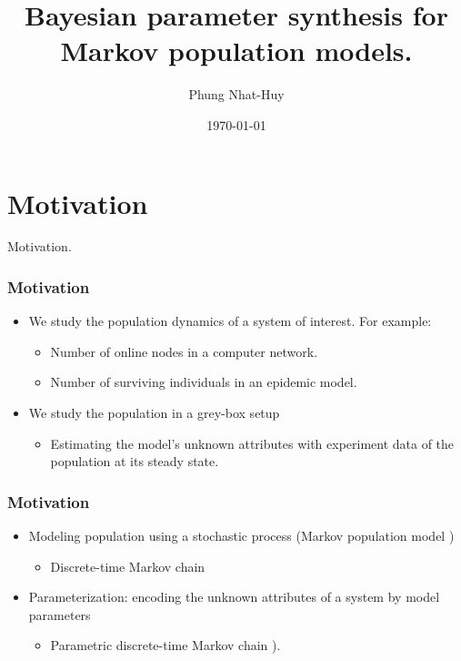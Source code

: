 \documentclass{beamer}
\title{Bayesian parameter synthesis for Markov population models.}
\author{Phung Nhat-Huy}
\date{\today}
\institute{University of Konstanz}
\begin{document}
\frame{\titlepage}
\frame{\tableofcontents}

\section{Motivation}
\begin{frame}
    \begin{center}
        \Huge Motivation.
    \end{center}
\end{frame}

\begin{frame}
    \frametitle{Motivation}
    \begin{itemize}
        \item We study the population dynamics of a system of interest. For example:
              \begin{itemize}
                  \item Number of online nodes in a computer network.
                  \item Number of surviving individuals in an epidemic model.
              \end{itemize}
        \item We study the population in a grey-box setup
              \begin{itemize}
                  \item Estimating the model's unknown attributes with experiment data of the
                        population at its steady state.
              \end{itemize}
    \end{itemize}
\end{frame}

\begin{frame}
    \frametitle{Motivation}
    \begin{itemize}
        \item Modeling population using a stochastic process (Markov population model
              \cite{kingman1969markov})
              \begin{itemize}
                  \item Discrete-time Markov chain
              \end{itemize}
        \item Parameterization: encoding the unknown attributes of a system by model parameters
              \begin{itemize}
                  \item Parametric discrete-time Markov chain \cite{katoen2016probabilistic}).
              \end{itemize}
    \end{itemize}
\end{frame}
\end{document}
